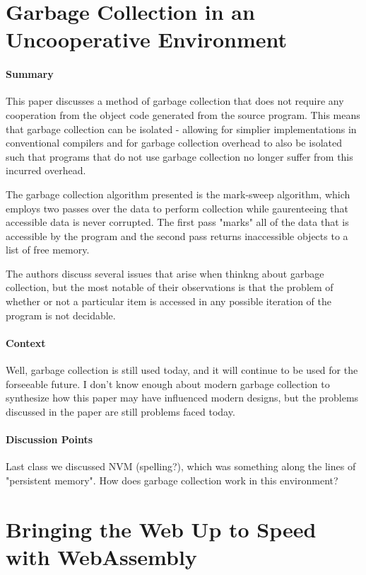 \section {Garbage Collection in an Uncooperative Environment
\cite{boehm1988garbage}}


\paragraph{\textbf{Summary}}
This paper discusses a method of garbage collection that does not require
any cooperation from the object code generated from the source program.
This means that garbage collection can be isolated - allowing for simplier
implementations in conventional compilers and for garbage collection
overhead to also be isolated such that programs that do not use garbage
collection no longer suffer from this incurred overhead.

The garbage collection algorithm presented is the mark-sweep algorithm,
which employs two passes over the data to perform collection while
gaurenteeing that accessible data is never corrupted. The first pass "marks"
all of the data that is accessible by the program and the second pass
returns inaccessible objects to a list of free memory.

The authors discuss several issues that arise when thinkng about garbage
collection, but the most notable of their observations is that the
problem of whether or not a particular item is accessed in any possible
iteration of the program is not decidable. 
\paragraph{\textbf{Context}}
Well, garbage collection is still used today, and it will continue to be
used for the forseeable future. I don't know enough about modern garbage
collection to synthesize how this paper may have influenced modern designs,
but the problems discussed in the paper are still problems faced today.
\paragraph{\textbf{Discussion Points}}
Last class we discussed NVM (spelling?), which was something along the
lines of "persistent memory". How does garbage collection work in this
environment?


\section {Bringing the Web Up to Speed with WebAssembly \cite{haas2017bringing}}


